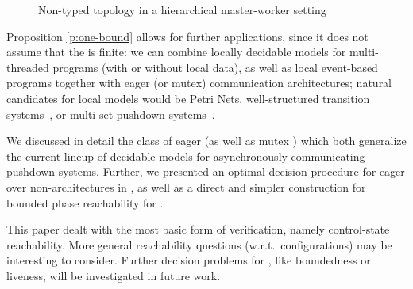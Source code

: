 \documentclass{LMCS}
\begin{document}
\begin{figure}[t]
 \caption{Non-\converging typed topology in a hierarchical
  master-worker setting}
\label{fig:examplearch}
\end{figure}

Proposition \ref{p:one-bound} allows for further
applications, since it does not assume that the \qcp is finite: we can
combine locally decidable models for
multi-threaded programs (with or without local data), as
well as local event-based programs together with eager (or mutex)
communication architectures; natural candidates for local
models would be Petri Nets, well-structured transition systems~\cite{finkel-a-2001-63-a}, or
multi-set pushdown systems~\cite{sen-k-2006-300-a}.




\medskip {} We discussed
in detail the class of eager \rqcp (as well as mutex \qcp)
which both generalize the current lineup of decidable models
for asynchronously communicating pushdown systems. Further,
we presented an optimal decision procedure for eager
\rqcp over non-\converging architectures in \dexptime,
as well as  a direct and simpler construction
for bounded phase reachability for \rqcp.

\medskip {} This paper dealt with the most basic form of verification, namely control-state
reachability. More general reachability questions
(w.r.t.~configurations) may be interesting to consider.
Further decision problems for \qcp, like boundedness or liveness, will
be investigated in future work.



 




\end{document}
